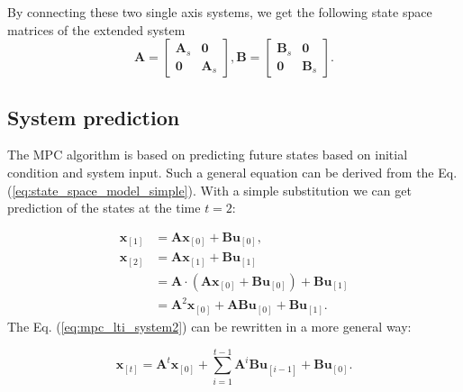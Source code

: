 \documentclass[a4paper,11pt,titlepage]{article}
\begin{document}
By connecting these two single axis systems, we get the following state space matrices of the extended system
\begin{equation}
\label{eq:state_space}
\textbf{A} = \begin{bmatrix}
	\textbf{A}_s & \textbf{0}	\\
	\textbf{0}   & \textbf{A}_s
\end{bmatrix}, \textbf{B} = \begin{bmatrix}
	\textbf{B}_s & \textbf{0}	\\
	\textbf{0}   & \textbf{B}_s
\end{bmatrix}.
\end{equation}









\subsection{System prediction}
The MPC algorithm is based on predicting future states based on initial condition and system input. Such a general equation can be derived from the Eq. (\ref{eq:state_space_model_simple}). With a simple substitution we can get prediction of the states at the time $t = 2$:

\begin{equation}
\begin{split}
\label{eq:mpc_lti_system2}
\textbf{x}_{[1]} &= \textbf{A}\textbf{x}_{[0]} + \textbf{B}\textbf{u}_{[0]},\\
\textbf{x}_{[2]} &= \textbf{A}\textbf{x}_{[1]} + \textbf{B}\textbf{u}_{[1]}\\
&= \textbf{A}\cdot(\textbf{A}\textbf{x}_{[0]} + \textbf{B}\textbf{u}_{[0]}) + \textbf{B}\textbf{u}_{[1]} \\
&=\textbf{A}^2\textbf{x}_{[0]} + \textbf{A}\textbf{B}\textbf{u}_{[0]} + \textbf{B} \textbf{u}_{[1]}.
\end{split}
\end{equation}
The Eq. (\ref{eq:mpc_lti_system2}) can be rewritten in a more general way:

\begin{equation}
\label{eq:mpc_lti_system_general}
\textbf{x}_{[t]} =\textbf{A}^t\textbf{x}_{[0]} + 
\sum_{i = 1}^{t-1}\textbf{A}^{i}\textbf{B}\textbf{u}_{[i-1]} + \textbf{B} \textbf{u}_{[0]}.
\end{equation}
\end{document}
